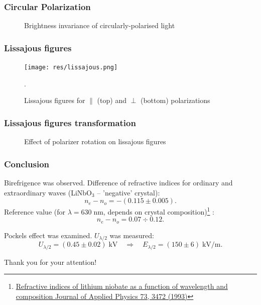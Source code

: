 \documentclass{beamer}
\begin{document}
	\begin{frame}
		\frametitle{Circular Polarization}
		\begin{figure}
			\centering
			\caption{Brightness invariance of circularly-polarised light}
		\end{figure}
	\end{frame}

	\begin{frame}
		\frametitle{Lissajous figures}


		\begin{figure}
			\centering
			\texttt{[image: res/lissajous.png]}
			\vspace{-10pt}
			\caption{\footnotesize  Lissajous figures for $\parallel$ (top) and $\perp$ (bottom) polarizations}.
		\end{figure}
				
	\end{frame}

	\begin{frame}
		\frametitle{Lissajous figures transformation}
		\begin{figure}
			\centering
			\movie[width=\linewidth, height=0.5625\linewidth, poster]{}{res/rotation.mp4}
			\caption{Effect of polarizer rotation on lissajous figures}
		\end{figure}
				
		
	\end{frame}

	\begin{frame}
		\frametitle{Conclusion}
		
		Birefrigence was observed. Difference of refractive indices for ordinary and extraordinary waves (LiNbO$_3$ -- 'negative' crystal):
		$$ n_e - n_o = -(0.115 \pm 0.005).$$
		Reference value (for $\lambda = 630 \; \text{nm}$, depends on crystal composition)\footnote{\href{https://doi.org/10.1063/1.352951}{
			Refractive indices of lithium niobate as a function of wavelength and composition 
			Journal of Applied Physics 73, 3472 (1993)}}
		:
		$$ n_e - n_o = 0.07 \div 0.12.$$
		
		Pockels effect was examined. $U_{\lambda/2}$ was measured:
		$$ U_{\lambda/2} = (0.45 \pm 0.02) \; \text{kV}\quad \Rightarrow \quad E_{\lambda/2} = (150 \pm 6) \; \text{kV}/\text{m}.$$
	\end{frame}
	
	\begin{frame}[plain,c]
		\begin{center}
			\huge {} Thank you for your attention!
		\end{center}
	\end{frame}
		
	
\end{document}
